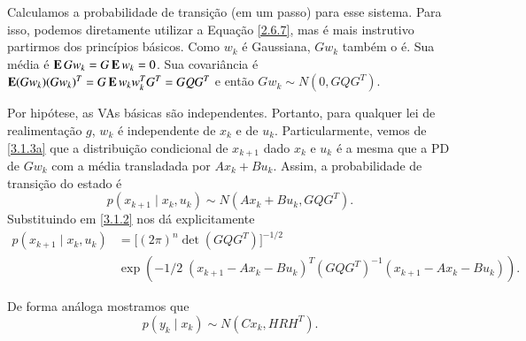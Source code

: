 Calculamos a probabilidade de transição (em um passo) para esse sistema. Para isso, podemos diretamente utilizar a Equação \eqref{2.6.7}, mas é mais instrutivo partirmos dos princípios básicos. Como $w_k$ é Gaussiana, $Gw_k$ também o é. Sua média é $\operatorname{\bf E} Gw_k=G\operatorname{\bf E} w_k=0$. Sua covariância é $\operatorname{\bf E} (Gw_k)(Gw_k)^T=G\operatorname{\bf E} w_kw_k^TG^T=GQG^T$ e então $Gw_k\sim N(0,GQG^T)$.

Por hipótese, as VAs básicas são independentes. Portanto, para qualquer lei de realimentação $g$, $w_k$ é independente de $x_k$ e de $u_k$. Particularmente, vemos de \eqref{3.1.3a} que a distribuição condicional de $x_{k+1}$ dado $x_k$ e $u_k$ é a mesma que a PD de $Gw_k$ com a média transladada por $Ax_k+Bu_k$. Assim, a probabilidade de transição do estado é
\begin{equation}\label{3.1.5}
	p(x_{k+1}\;|\;x_k,u_k) \sim
	N(Ax_k+Bu_k,GQG^T).
\end{equation}
Substituindo em \eqref{3.1.2} nos dá explicitamente
\[
\begin{split}
	p(x_{k+1}\;|\;x_k,u_k) &= \Big[(2\pi)^n
	\det(GQG^T)
	\Big]^{-1/2}\\&\exp\left(-1/2\;
	(x_{k+1}-Ax_k-Bu_k)^T  (GQG^T)^{-1}
	(x_{k+1}-Ax_k-Bu_k)
	\right).
\end{split}
\]

De forma análoga mostramos que
\begin{equation}\label{3.1.6}
	p(y_k\;|\; x_k) \sim N(Cx_k,HRH^T).
\end{equation}

